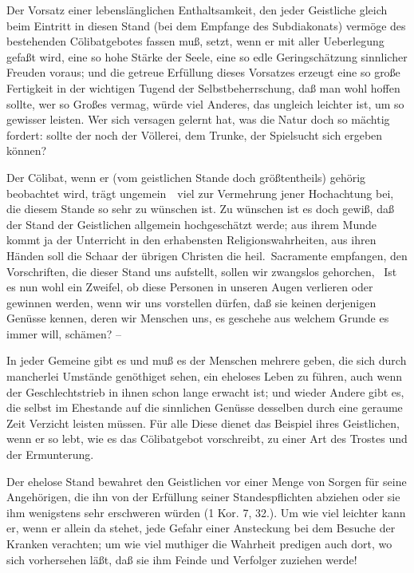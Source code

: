 \begin{aufza}
\begin{aufzb}
\item Der Vorsatz einer lebenslänglichen Enthaltsamkeit, den jeder Geistliche gleich beim Eintritt in diesen Stand (bei dem Empfange des Subdiakonats) vermöge des bestehenden Cölibatgebotes fassen muß, setzt, wenn er mit aller Ueberlegung gefaßt wird, eine so hohe Stärke der Seele, eine so edle Geringschätzung sinnlicher Freuden voraus; und die getreue Erfüllung dieses Vorsatzes erzeugt eine so große Fertigkeit in der wichtigen Tugend der Selbstbeherrschung, daß man wohl hoffen sollte, wer so Großes vermag, würde viel Anderes, das ungleich leichter ist, um so gewisser leisten. Wer sich versagen gelernt hat, was die Natur doch so mächtig fordert: sollte der noch der Völlerei, dem Trunke, der Spielsucht sich ergeben können?
\item Der Cölibat, wenn er (vom geistlichen Stande doch größtentheils) gehörig beobachtet wird, trägt ungemein~\ viel zur Vermehrung jener Hochachtung bei, die diesem Stande so sehr zu wünschen ist. Zu wünschen ist es doch gewiß, daß der Stand der Geistlichen allgemein hochgeschätzt werde; aus ihrem Munde kommt ja der Unterricht in den erhabensten Religionswahrheiten, aus ihren Händen soll die Schaar der übrigen Christen die heil.\ Sacramente empfangen, den Vorschriften, die dieser Stand uns aufstellt, sollen wir zwangslos gehorchen, \usw\ Ist es nun wohl ein Zweifel, ob diese Personen in unseren Augen verlieren oder gewinnen werden, wenn wir uns vorstellen dürfen, daß sie keinen derjenigen Genüsse kennen, deren wir Menschen uns, es geschehe aus welchem Grunde es immer will, schämen? --
\item In jeder Gemeine gibt es und muß es der Menschen mehrere geben, die sich durch mancherlei Umstände genöthiget sehen, ein eheloses Leben zu führen, auch wenn der Geschlechtstrieb in ihnen schon lange erwacht ist; und wieder Andere gibt es, die selbst im Ehestande auf die sinnlichen Genüsse desselben durch eine geraume Zeit Verzicht leisten müssen. Für alle Diese dienet das Beispiel ihres Geistlichen, wenn er so lebt, wie es das Cölibatgebot vorschreibt, zu einer Art des Trostes und der Ermunterung.
\item Der ehelose Stand bewahret den Geistlichen vor einer Menge von Sorgen für seine Angehörigen, die ihn von der Erfüllung seiner Standespflichten abziehen oder sie ihm wenigstens sehr erschweren würden (1 Kor. 7, 32.). Um wie viel leichter kann er, wenn er allein da stehet, jede Gefahr einer Ansteckung bei dem Besuche der Kranken verachten; um wie viel muthiger die Wahrheit predigen auch dort, wo sich vorhersehen läßt, daß sie ihm Feinde und Verfolger zuziehen werde!

\end{aufzb}
\end{aufza}
